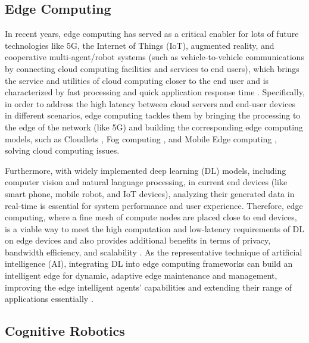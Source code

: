 \documentclass[letterpaper]{article} %
\begin{document}
\subsection{Edge Computing}
In recent years, edge computing has served as a critical enabler for lots of future technologies like 5G, the Internet of Things (IoT), augmented reality, and cooperative multi-agent/robot systems (such as vehicle-to-vehicle communications by connecting cloud computing facilities and services to end users), which brings the service and utilities of cloud computing closer to the end user and is characterized by fast processing and quick application response time \cite{khan2019edge}. Specifically, in order to address the high latency between cloud servers and end-user devices in different scenarios, edge computing tackles them by bringing the processing to the edge of the network (like 5G) and building the corresponding edge computing models, such as Cloudlets \cite{shaukat2016cloudlet}, Fog computing \cite{bao2017follow}, and Mobile Edge computing \cite{ahmed2017mobile}, solving cloud computing issues.

Furthermore, with widely implemented deep learning (DL) models, including computer vision and natural language processing, in current end devices (like smart phone, mobile robot, and IoT devices), analyzing their generated data in real-time is essential for system performance and user experience. Therefore, edge computing, where a fine mesh of compute nodes are placed close to end devices, is a viable way to meet the high computation and low-latency requirements of DL on edge devices and also provides additional benefits in terms of privacy, bandwidth efficiency, and scalability \cite{chen2019deep}. As the representative technique of artificial intelligence (AI), integrating DL into edge computing frameworks can build an intelligent edge for dynamic, adaptive edge maintenance and management, improving the edge intelligent agents' capabilities and extending their range of applications essentially \cite{wang2020convergence}.

\subsection{Cognitive Robotics}
\end{document}

